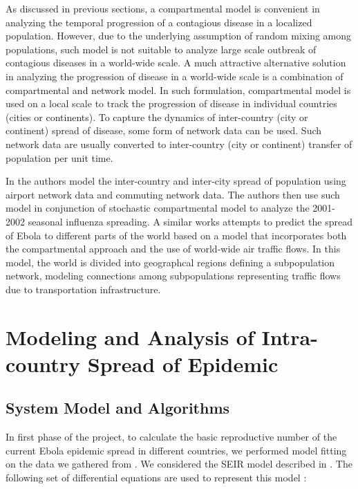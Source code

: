 \documentclass[10pt, journal,onecolumn]{IEEEtran}
\begin{document}
As discussed in previous sections, a compartmental model is convenient in analyzing the temporal progression of a contagious disease in a localized population. However, due to the underlying assumption of random mixing among populations, such model is not suitable to analyze large scale outbreak of contagious diseases in a world-wide scale. A much attractive alternative solution in analyzing the progression of disease in a world-wide scale is a combination of compartmental and network model. In such formulation, compartmental model is used on a local scale to track the progression of disease in individual countries (cities or continents). To capture the dynamics of inter-country (city or continent) spread of disease, some form of network data can be used. Such network data are usually converted to inter-country (city or continent) transfer of population per unit time.

In \citep{balcan2010modeling} the authors model the inter-country and inter-city spread of population using airport network data and commuting network data. The authors then use such model in conjunction of stochastic compartmental model to analyze the  2001-2002 seasonal influenza spreading. A similar works  \citep{gomes2014assessing}  attempts to predict the spread of Ebola to different parts of the world based on a model that incorporates both the compartmental approach and the use of world-wide air traffic flows. In this model, the world is divided into geographcal regions defining a subpopulation network, modeling connections among subpopulations representing traffic flows due to transportation infrastructure.



\section{{Modeling and Analysis of Intra-country Spread of Epidemic}}
\label{sec:IntraCountry}

\subsection{System Model and Algorithms}
In first phase of the project, to calculate the basic reproductive number of the current Ebola
epidemic spread in different countries, we performed model fitting on the data we gathered from
\citep{cmriversdata}. We considered the SEIR model described in \citep{chowell2004basic}. The following set of differential equations are used to represent this model \citep{chowell2004basic}:
\end{document}
